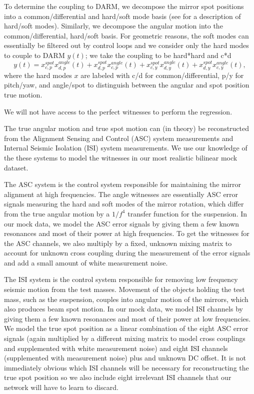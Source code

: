 \begin{refsection}
To determine the coupling to DARM, we decompose the mirror spot positions into a common/differential and hard/soft mode basis (see \cite{Dooley:13,SIDLES2006167,LIGO:2015} for a description of hard/soft modes). Similarly, we decompose the angular motion into the common/differential, hard/soft basis. For geometric reasons, the soft modes can essentially be filtered out by control loops and we consider only the hard modes to couple to DARM $y(t)$; we take the coupling to be hard*hard and c*d
\begin{equation}
y(t)=x^{spot}_{c, p}x^{angle}_{d,p}(t)+x^{spot}_{d, p}x^{angle}_{c,p}(t)+x^{spot}_{c, y}x^{angle}_{d,y}(t)+x^{spot}_{d, y}x^{angle}_{c,y}(t),
\end{equation}
where the hard modes $x$ are labeled with c/d  for common/differential, p/y for pitch/yaw, and angle/spot to distinguish between the angular and spot position true motion.


We will not have access to the perfect witnesses to perform the regression.

The true angular motion and true spot motion can (in theory) be reconstructed from the Alignment Sensing and Control (ASC) system measurements and Internal Seismic Isolation (ISI) system measurements. We use our knowledge of the these systems to model the witnesses in our most realistic bilinear mock dataset.

The ASC system is the control system responsible for maintaining the mirror alignment at high frequencies. The angle witnesses are essentially ASC error signals measuring the hard and soft modes of the mirror rotation, which differ from the true angular motion by  a $1/f^4$ transfer function for the suspension. In our mock data, we model the ASC error signals by giving them a few known resonances and most of their power at high frequencies. To get the witnesses for the ASC channels, we also multiply by a fixed, unknown mixing matrix to account for unknown cross coupling during the measurement of the error signals and add a small amount of white measurement noise.

The ISI system is the control system responsible for removing low frequency seismic motion from the test masses. Movement of the objects holding the test mass, such as the suspension, couples into angular motion of the mirrors, which also produces beam spot motion. In our mock data, we model ISI channels by giving them a few known resonances and most of their power at low frequencies. We model the true spot position as a linear combination of the eight ASC error signals (again multiplied by a different mixing matrix to model cross couplings and supplemented with white measurement noise) and eight ISI channels (supplemented with measurement noise) plus and unknown DC offset. It is not immediately obvious which ISI channels will be necessary for reconstructing the true spot position so we also include eight irrelevant ISI channels that our network will have to learn to discard.


\end{refsection}
